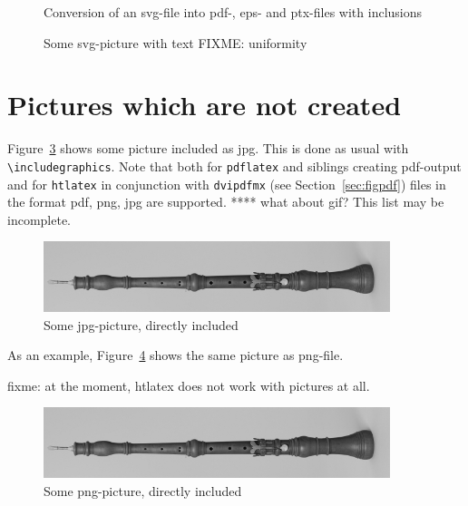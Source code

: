 \documentclass[12pt]{book}
\begin{document}
\begin{figure}[htb]
\begin{center}
%
\end{center}
\caption{\label{fig:svg2pdf}Conversion of an svg-file 
into pdf-, eps- and ptx-files with inclusions}
\end{figure}


\begin{figure}[htb]
\begin{center}
\def\svgwidth{0.5\textwidth}
%
\end{center}
\caption{\label{fig:svgWithText}Some svg-picture with text FIXME: uniformity  }
\end{figure}



\section{Pictures which are not created}\label{sec:picasis}

Figure~\ref{fig:asIsJpg} shows some picture included as jpg. 
This is done as usual with {\tt\textbackslash includegraphics}. 
Note that both for {\tt pdflatex} and siblings creating pdf-output 
and for {\tt htlatex} in conjunction with {\tt dvipdfmx} 
(see Section~\ref{sec:figpdf}) 
files in the format pdf, \gls{png}, \gls{jpg} are supported. 
 **** what about \gls{gif}? 
This list may be incomplete. 

\begin{figure}[htb]
\begin{center}
\includegraphics[width=0.9\textwidth]{F4_08someJpgOboeBaroqueDennerMIR370}%
\end{center}
\caption{\label{fig:asIsJpg}Some jpg-picture, directly included }
\end{figure}

As an example, Figure~\ref{fig:asIsPng} shows the same picture 
as png-file. 

fixme: at the moment, htlatex does not work with pictures at all. 

\begin{figure}[htb]
\begin{center}
\includegraphics[width=0.9\textwidth]{F4_09somePngOboeBaroqueDennerMIR370}%
\end{center}
\caption{\label{fig:asIsPng}Some png-picture, directly included }
\end{figure}
\end{document}
